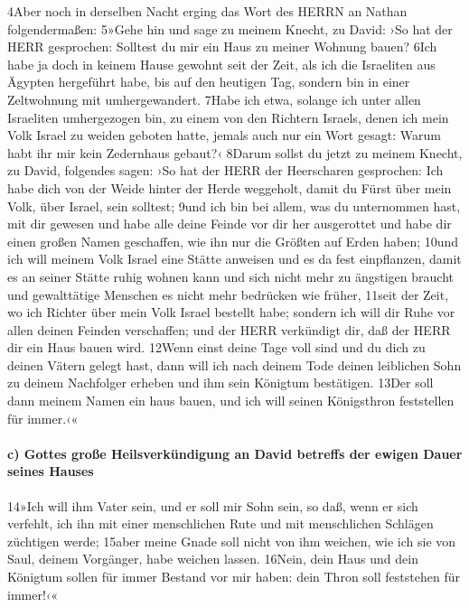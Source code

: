 4Aber noch in derselben Nacht erging das Wort des HERRN an Nathan
folgendermaßen: 5»Gehe hin und sage zu meinem Knecht, zu David: ›So hat
der HERR gesprochen: Solltest du mir ein Haus zu meiner Wohnung bauen?
6Ich habe ja doch in keinem Hause gewohnt seit der Zeit, als ich die
Israeliten aus Ägypten hergeführt habe, bis auf den heutigen Tag,
sondern bin in einer Zeltwohnung mit umhergewandert. 7Habe ich etwa,
solange ich unter allen Israeliten umhergezogen bin, zu einem von den
Richtern Israels, denen ich mein Volk Israel zu weiden geboten hatte,
jemals auch nur ein Wort gesagt: Warum habt ihr mir kein Zedernhaus
gebaut?‹ 8Darum sollst du jetzt zu meinem Knecht, zu David, folgendes
sagen: ›So hat der HERR der Heerscharen gesprochen: Ich habe dich von
der Weide hinter der Herde weggeholt, damit du Fürst über mein Volk,
über Israel, sein solltest; 9und ich bin bei allem, was du unternommen
hast, mit dir gewesen und habe alle deine Feinde vor dir her ausgerottet
und habe dir einen großen Namen geschaffen, wie ihn nur die Größten auf
Erden haben; 10und ich will meinem Volk Israel eine Stätte anweisen und
es da fest einpflanzen, damit es an seiner Stätte ruhig wohnen kann und
sich nicht mehr zu ängstigen braucht und gewalttätige Menschen es nicht
mehr bedrücken wie früher, 11seit der Zeit, wo ich Richter über mein
Volk Israel bestellt habe; sondern ich will dir Ruhe vor allen deinen
Feinden verschaffen; und der HERR verkündigt dir, daß der HERR dir ein
Haus bauen wird. 12Wenn einst deine Tage voll sind und du dich zu deinen
Vätern gelegt hast, dann will ich nach deinem Tode deinen leiblichen
Sohn zu deinem Nachfolger erheben und ihm sein Königtum bestätigen.
13Der soll dann meinem Namen ein haus bauen, und ich will seinen
Königsthron feststellen für immer.‹«

\hypertarget{c-gottes-grouxdfe-heilsverkuxfcndigung-an-david-betreffs-der-ewigen-dauer-seines-hauses}{%
\paragraph{c) Gottes große Heilsverkündigung an David betreffs der
ewigen Dauer seines
Hauses}\label{c-gottes-grouxdfe-heilsverkuxfcndigung-an-david-betreffs-der-ewigen-dauer-seines-hauses}}

14»Ich will ihm Vater sein, und er soll mir Sohn sein, so daß, wenn er
sich verfehlt, ich ihn mit einer menschlichen Rute und mit menschlichen
Schlägen züchtigen werde; 15aber meine Gnade soll nicht von ihm weichen,
wie ich sie von Saul, deinem Vorgänger, habe weichen lassen. 16Nein,
dein Haus und dein Königtum sollen für immer Bestand vor mir haben: dein
Thron soll feststehen für immer!‹«

